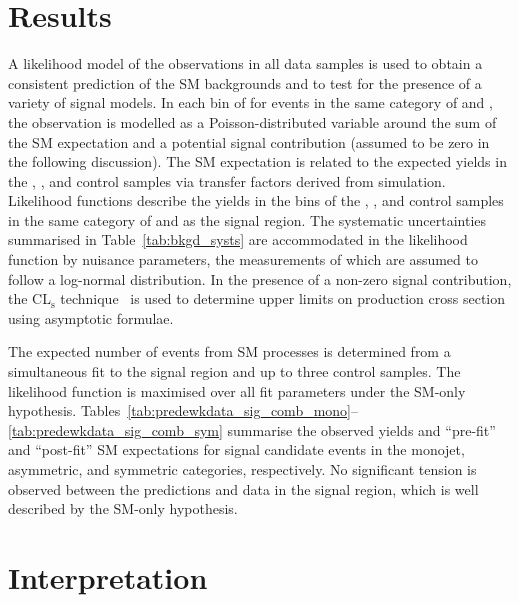 \clearpage
\section{Results}
\label{sec:interpretation}

A likelihood model of the observations in all data samples is used to
obtain a consistent prediction of the SM backgrounds and to test for
the presence of a variety of signal models.  In each bin of \scalht
for events in the same category of \njet and \nb, the observation is
modelled as a Poisson-distributed variable around the sum of the SM
expectation and a potential signal contribution (assumed to be zero in
the following discussion). The SM expectation is related to the
expected yields in the \mj, \mmj, and \gj control samples via transfer
factors derived from simulation. Likelihood functions describe the
yields in the \scalht bins of the \mj, \mmj, and \gj control samples
in the same category of \njet and \nb as the signal region. The
systematic uncertainties summarised in Table~\ref{tab:bkgd_systs} are
accommodated in the likelihood function by nuisance parameters, the
measurements of which are assumed to follow a log-normal
distribution. In the presence of a non-zero signal contribution, the
CL$_{\mathrm{s}}$ technique~\cite{read, Cowan:2010js} is used to
determine upper limits on production cross section using asymptotic
formulae.

The expected number of events from SM processes is determined from a
simultaneous fit to the signal region and up to three control
samples. The likelihood function is maximised over all fit parameters
under the SM-only hypothesis.
Tables~\ref{tab:predewkdata_sig_comb_mono}--\ref{tab:predewkdata_sig_comb_sym}
summarise the observed yields and ``pre-fit'' and ``post-fit'' SM
expectations for signal candidate events in the monojet, asymmetric,
and symmetric categories, respectively. No significant tension is
observed between the predictions and data in the signal region, which
is well described by the SM-only hypothesis.


\clearpage

\clearpage

\clearpage

\section{Interpretation}

